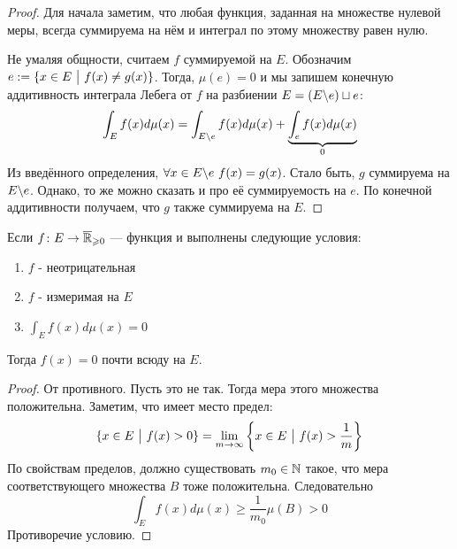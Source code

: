 \begin{proof}
	Для начала заметим, что любая функция, заданная на множестве нулевой меры, всегда суммируема на нём и интеграл по этому множеству равен нулю.
	
	Не умаляя общности, считаем $f$ суммируемой на $E$. Обозначим $e := \{x \in E \ \big|\  f(x) \neq g(x)\}$. Тогда, $\mu(e) = 0$ и мы запишем конечную аддитивность интеграла Лебега от $f$ на разбиении $E = (E \backslash e) \sqcup e$:
	\[
		\int_E f(x)d\mu(x) = \int_{E \backslash e} f(x)d\mu(x) + \underbrace{\int_e f(x)d\mu(x)}_{0}
	\]
	Из введённого определения, $\forall x \in E \backslash e\ f(x) = g(x)$. Стало быть, $g$ суммируема на $E \backslash e$. Однако, то же можно сказать и про её суммируемость на $e$. По конечной аддитивности получаем, что $g$ также суммируема на $E$.
\end{proof}

\begin{corollary}
	Если $f \colon E \to \overline{\mathbb{R}}_{\geqslant 0}$ --- функция и выполнены следующие условия:
	\begin{enumerate}
		\item $f$ - неотрицательная
		
		\item $f$ - измеримая на $E$
		
		\item $\int_E f(x)d\mu(x) = 0$
	\end{enumerate}
	Тогда $f(x) = 0$ почти всюду на $E$.
\end{corollary}

\begin{proof}
	От противного. Пусть это не так. Тогда мера этого множества положительна. Заметим, что имеет место предел:
	\[
		\{x \in E \ \big|\  f(x) > 0\} = \lim_{m \to \infty} \left\{x \in E \ \big|\  f(x) > \frac{1}{m}\right\}
	\]
	По свойствам пределов, должно существовать $m_0 \in \mathbb{N}$ такое, что мера соответствующего множества $B$ тоже положительна. Следовательно
	\[
		\int_E f(x)d\mu(x) \ge \frac{1}{m_0}\mu(B) > 0
	\]
	Противоречие условию.
\end{proof}